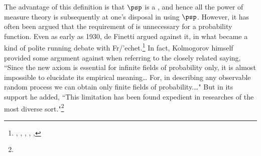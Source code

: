 \begin{remark}
The advantage of this definition is that $\psp$ is a , and hence all the power of measure theory 
is subsequently at one's disposal in using $\psp$.
However, it has often been argued that the requirement of  is unnecessary for a probability function.
Even as early as 1930, de Finetti argued against it, in what became a kind of polite running debate with Fr/'echet.\footnote{
  ,
  ,
  ,
  ,
  ,
  }
In fact, Kolmogorov himself provided some argument against  when referring to the closely related 
 saying,
``Since the new axiom is essential for infinite fields of probability only,
it is almost impossible to elucidate its empirical meaning\ldots
For, in describing any observable random process we can obtain only finite fields of probability.\ldots"
But in its support he added, ``This limitation has been found expedient in researches of the most diverse sort."\footnote{
  }


\end{remark}
